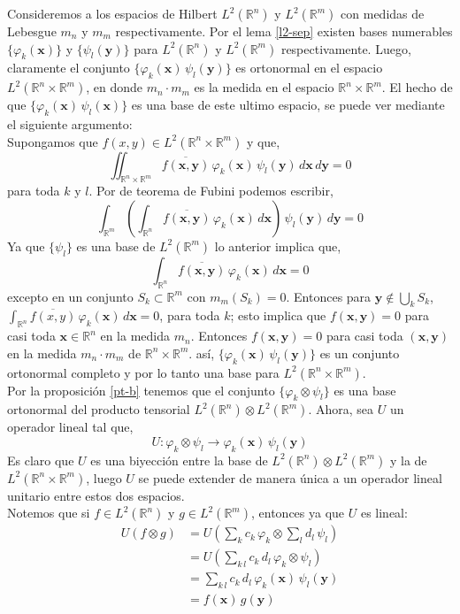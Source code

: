 \documentclass[12pt]{book}
\numberwithin{equation}{chapter}
\def\ol{\overline}
\def\R{\mathbb{R}}
\def\rar{\rightarrow}
\def\vp{\varphi}
\def\x{\mathbf{x}}
\def\y{\mathbf{y}}
\begin{document}
Consideremos a los espacios de Hilbert $L^{2}(\R^{n})$ y $L^{2}(\R^{m})$ con medidas de Lebesgue $m_{n}$ y $m_{m}$ respectivamente. Por el lema \ref{l2-sep} existen bases numerables $\{\vp_{k}(\x) \}$ y $\{ \psi_{l}(\y) \}$ para $L^{2}(\R^{n})$ y $L^{2}(\R^{m})$ respectivamente. Luego, claramente el conjunto $ \{ \vp_{k}(\x)\, \psi_{l}(\y) \} $ es ortonormal en el espacio $ L^{2}( \R^{n} \times \R^{m} ) $, en donde $m_{n} \cdot m_{m}$ es la medida en el espacio $\R^{n} \times \R^{m}$. El hecho de que $ \{ \vp_{k}(\x)\, \psi_{l}(\x) \} $ es una base de este ultimo espacio, se puede ver mediante el siguiente argumento:\\
Supongamos que $f(x,y) \in L^{2}( \R^{n}\times \R^{m} )$ y que,
$$  \iint_{\R^{n} \times \R^{m}} \ol{f(\x,\y)}\, \vp_{k}(\x) \, \psi_{l}(\y)\, d\x \, d\y =0 $$
para toda $k$ y $l$. Por de teorema de Fubini podemos escribir,
$$ \int_{\R^{m}} \left( \int_{\R^{n}} \ol{f(\x,\y)}\, \vp_{k}(\x)\, d\x \right)\, \psi_{l}(\y)\, d\y =0$$
Ya que $ \{ \psi_{l} \} $ es una base de $L^{2}(\R^{m})$ lo anterior implica que,
$$ \int_{\R^{n}} \ol{f(\x,\y)}\, \vp_{k}(\x)\, d\x =0$$
excepto en un conjunto $ S_{k} \subset \R^{m} $ con $ m_{m}(S_{k})=0 $. Entonces para $ \y \notin \bigcup_{k} S_{k} $, $ \int_{\R^{n}} \ol{f(x,y)}\, \vp_{k}(\x)\, d\x=0 $, para toda $k$; esto implica que $ f(\x,\y)=0$ para casi toda $\x \in \R^{n}$ en la medida $m_{n}$. Entonces $ f(\x,\y)=0 $ para casi toda $(\x,\y)$ en la medida $ m_{n}\cdot m_{m} $ de $\R^{n} \times \R^{m} $. as\'i, $\{ \vp_{k}(\x)\, \psi_{l}(\y) \}$ es un conjunto ortonormal completo y por lo tanto una base para $ L^{2}( \R^{n}\times \R^{m} ) $.\\

Por la proposici\'on \ref{pt-b} tenemos que el conjunto $\{ \vp_{k} \otimes \psi_{l} \}$ es una base ortonormal del producto tensorial $L^{2}(\R^{n}) \otimes L^{2}(\R^{m})$. Ahora, sea $U$ un operador lineal tal que,
$$ U: \vp_{k} \otimes \psi_{l} \rar \vp_{k}(\x)\, \psi_{l}(\y) $$
Es claro que $U$ es una biyecci\'on entre la base de $ L^{2}(\R^{n}) \otimes L^{2}(\R^{m}) $ y la de $L^{2}(\R^{n} \times \R^{m})$, luego $U$ se puede extender de manera \'unica a un operador lineal unitario entre estos dos espacios.\\

Notemos que si $ f \in L^{2}(\R^{n}) $ y $ g \in L^{2}(\R^{m}) $, entonces ya que $U$ es lineal: 
\begin{align*}
U(f \otimes g) &= U\left( \sum_{k} c_{k}\, \vp_{k} \otimes \sum_{l} d_{l}\, \psi_{l} \right)\\
&= U \left( \sum_{k\,l} c_{k}\,d_{l}\, \vp_{k}\otimes \psi_{l} \right)\\
&=  \sum_{k\,l} c_{k}\,d_{l}\, \vp_{k}(\x) \, \psi_{l}(\y) \\
&= f(\x)\, g(\y)
\end{align*}
\end{document}
